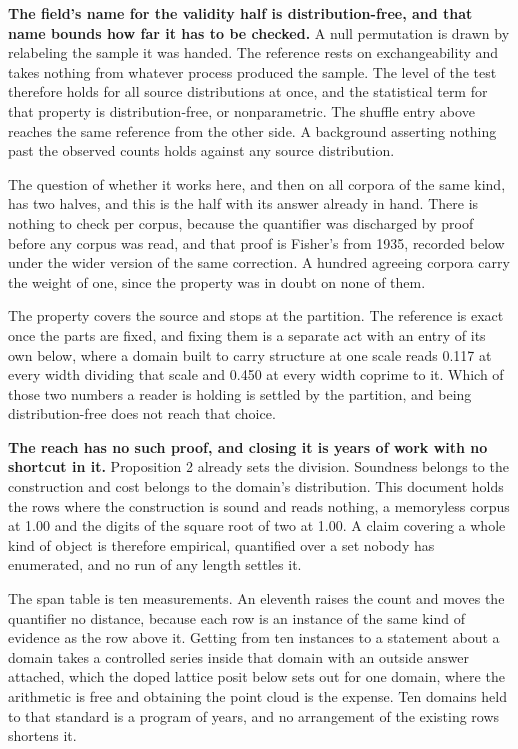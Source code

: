 \textbf{The field's name for the validity half is distribution-free, and that name bounds how far it has to be checked.} A null permutation is drawn by relabeling the sample it was handed. The reference rests on exchangeability and takes nothing from whatever process produced the sample. The level of the test therefore holds for all source distributions at once, and the statistical term for that property is distribution-free, or nonparametric. The shuffle entry above reaches the same reference from the other side. A background asserting nothing past the observed counts holds against any source distribution.

The question of whether it works here, and then on all corpora of the same kind, has two halves, and this is the half with its answer already in hand. There is nothing to check per corpus, because the quantifier was discharged by proof before any corpus was read, and that proof is Fisher's from 1935, recorded below under the wider version of the same correction. A hundred agreeing corpora carry the weight of one, since the property was in doubt on none of them.

The property covers the source and stops at the partition. The reference is exact once the parts are fixed, and fixing them is a separate act with an entry of its own below, where a domain built to carry structure at one scale reads 0.117 at every width dividing that scale and 0.450 at every width coprime to it. Which of those two numbers a reader is holding is settled by the partition, and being distribution-free does not reach that choice.

\textbf{The reach has no such proof, and closing it is years of work with no shortcut in it.} Proposition 2 already sets the division. Soundness belongs to the construction and cost belongs to the domain's distribution. This document holds the rows where the construction is sound and reads nothing, a memoryless corpus at 1.00 and the digits of the square root of two at 1.00. A claim covering a whole kind of object is therefore empirical, quantified over a set nobody has enumerated, and no run of any length settles it.

The span table is ten measurements. An eleventh raises the count and moves the quantifier no distance, because each row is an instance of the same kind of evidence as the row above it. Getting from ten instances to a statement about a domain takes a controlled series inside that domain with an outside answer attached, which the doped lattice posit below sets out for one domain, where the arithmetic is free and obtaining the point cloud is the expense. Ten domains held to that standard is a program of years, and no arrangement of the existing rows shortens it.

